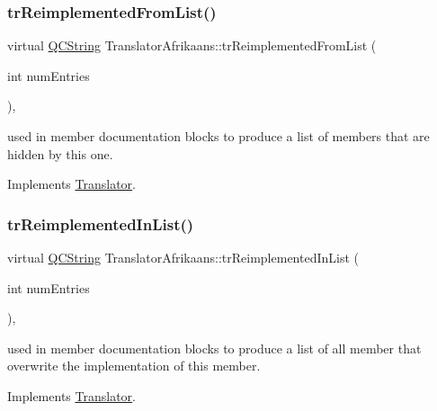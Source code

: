 \subsubsection{\texorpdfstring{trReimplementedFromList()}{trReimplementedFromList()}}
{\footnotesize\ttfamily virtual \mbox{\hyperlink{class_q_c_string}{Q\+C\+String}} Translator\+Afrikaans\+::tr\+Reimplemented\+From\+List (\begin{DoxyParamCaption}\item[{int}]{num\+Entries }\end{DoxyParamCaption})\hspace{0.3cm}{\ttfamily [inline]}, {\ttfamily [virtual]}}

used in member documentation blocks to produce a list of members that are hidden by this one. 

Implements \mbox{\hyperlink{class_translator}{Translator}}.

\mbox{\label{class_translator_afrikaans_a0fb0df4ebfb3d4a4dd57d15067c7da70}} 
\subsubsection{\texorpdfstring{trReimplementedInList()}{trReimplementedInList()}}
{\footnotesize\ttfamily virtual \mbox{\hyperlink{class_q_c_string}{Q\+C\+String}} Translator\+Afrikaans\+::tr\+Reimplemented\+In\+List (\begin{DoxyParamCaption}\item[{int}]{num\+Entries }\end{DoxyParamCaption})\hspace{0.3cm}{\ttfamily [inline]}, {\ttfamily [virtual]}}

used in member documentation blocks to produce a list of all member that overwrite the implementation of this member. 

Implements \mbox{\hyperlink{class_translator}{Translator}}.

\mbox{\label{class_translator_afrikaans_a50a460d67fc231953dc3c1784115ae8c}} 
